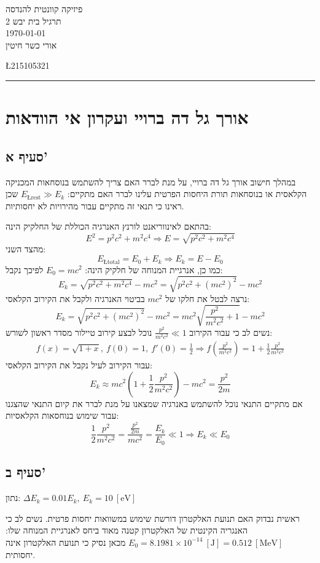 \documentclass{article}
\newcommand{\rect}[1]{\left[{#1}\right]}                %
\newcommand{\p}[1]{\left({#1}\right)}                   %
\newcommand{\n}{\newline}                       %
\newcommand{\vtab}{\vspace{1em}\noindent}       %
\newcommand{\ds}{\textendash\;}                 %
\newcommand{\txt}[1]{\mathrm{#1}}
\newcommand{\um}[1]{~\rect{\txt{#1}}}
\newcommand{\e}[1]{\times 10^{#1}}
\begin{document}
\begingroup
    \centering
    \LARGE פיזיקה קוונטית להנדסה\\
    \Large תרגיל בית יבש 2 \\[1 em]
    \large \today\\[0.5em]
    \large אורי כשר חיטין \par
    \large \L{215105321} \par
\endgroup
\rule{\textwidth}{0.4pt}

\section*{אורך גל דה ברויי ועקרון אי הוודאות}
\subsection*{סעיף א'}
במהלך חישוב אורך גל דה ברויי, על מנת לברר האם צריך להשתמש בנוסחאות המכניקה הקלאסית או בנוסחאות תורת היחסות הפרטית עלינו לברר האם מתקיים: $E_{\text{\L{rest}}} \gg E_k$ \ds שכן ראינו כי תנאי זה מתקיים עבור מהירויות לא יחסותיות.\n

\vtab
בהתאם לאינווריאנט לורנץ האנרגיה הכוללת של החלקיק הינה:
\[
    E^2=p^2c^2+m^2c^4 \Rightarrow E = \sqrt{p^2c^2+m^2c^4}
\]
מהצד השני: 
\[
    E_{\text{\L{total}}}=E_0+E_k \Rightarrow E_k = E - E_0
\]
כמו כן, אנרגיית המנוחה של חלקיק הינה: $E_0 = mc^2$\n
לפיכך נקבל:
\[
    E_k = \sqrt{p^2c^2+m^2c^4} - mc^2 = \sqrt{p^2c^2+\p{mc^2}^2} - mc^2
\]
נרצה לבטל את חלקו של $mc^2$ בביטוי האנרגיה ולקבל את הקירוב הקלאסי:
\[
    E_k = \sqrt{p^2c^2+\p{mc^2}^2} - mc^2 = mc^2\sqrt{\frac{p^2}{m^2c^2}+1}-mc^2
\]
נשים לב כי עבור הקירוב $\frac{p^2}{m^2c^2} \ll 1$ נוכל לבצע קירוב טיילור מסדר ראשון לשורש:
\begin{gather*}
    f(x)=\sqrt{1+x},~ f(0) = 1, ~f'(0)=\frac{1}{2} \Rightarrow f\p{\frac{p^2}{m^2c^2}} = 1+\frac{1}{2}\frac{p^2}{m^2c^2}
\end{gather*}
עבור הקירוב לעיל נקבל את הקירוב הקלאסי:
\[
    E_k \approx mc^2\p{1+\frac{1}{2}\frac{p^2}{m^2c^2}}-mc^2=\frac{p^2}{2m}
\]
אם מתקיים התנאי נוכל להשתמש באנרגיה שמצאנו על מנת לברר את קיום התנאי שהצגנו עבור שימוש בנוחסאות הקלאסיות:
\[
    \frac{1}{2}\frac{p^2}{m^2c^2} = \frac{\frac{p^2}{2m}}{mc^2} = \frac{E_k}{E_0} \ll 1 \Rightarrow E_k \ll E_0
\]

\subsection*{סעיף ב'}
נתון: $\Delta E_k = 0.01 E_k, ~E_k=10\um{eV}$\n

\vtab
ראשית נבדוק האם תנועת האלקטרון דורשת שימוש במשוואות יחסות פרטית.
נשים לב כי האנגריה הקינטית של האלקטרון קטנה מאוד ביחס לאנרגיית המנוחה שלו: $E_0 = 8.1981\e{-14}\um{J}=0.512 \um{MeV}$\n
מכאן נסיק כי תנועת האלקטרון אינה יחסותית. \n
\end{document}

